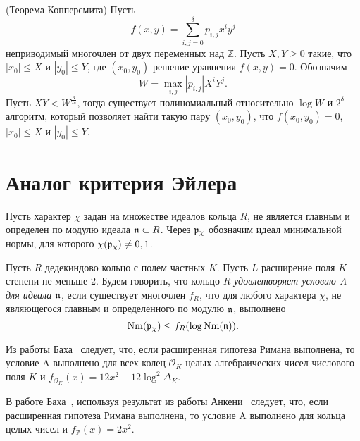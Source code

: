 \documentclass[_00_dissertation.tex]{subfiles}
\begin{document}
\begin{statement}\label{statement:coppersmith} \cite[с.~243]{source:Coppersmith} (Теорема Копперсмита)
    Пусть
    \begin{equation*}
        f(x, y) = \sum\limits_{i, j = 0}^{\delta} p_{i, j} x^i y^j
    \end{equation*}
    неприводимый многочлен от двух переменных над $\mathbb{Z}$.
    Пусть $X, Y \ge 0$ такие, что $|x_0| \le X$ и $|y_0| \le Y$, где $(x_0, y_0)$ решение уравнения $f(x, y) = 0$.
    Обозначим
    \begin{equation*}
        W = \max_{i, j} |p_{i, j}| X^i Y^j.
    \end{equation*}
    Пусть $XY < W^{\frac{3}{2\delta}}$, тогда существует полиномиальный относительно $\log W$ и $2^\delta$ алгоритм, который позволяет найти такую пару $(x_0, y_0)$, что $f(x_0, y_0) = 0$, $|x_0| \le X$ и $|y_0| \le Y$.
\end{statement}

\section{Аналог критерия Эйлера}

Пусть характер $\chi$ задан на множестве идеалов кольца $R$, не является главным и определен по модулю идеала $\mathfrak{n} \subset R$.
Через $\mathfrak{p}_{\chi}$ обозначим идеал минимальной нормы, для которого $\chi(\mathfrak{p}_{\chi}) \neq 0, 1$.

Пусть $R$ дедекиндово кольцо с полем частных $K$.
Пусть $L$ расширение поля $K$ степени не меньше $2$.
Будем говорить, что кольцо $R$ \emph{удовлетворяет условию A для идеала $\mathfrak{n}$}, если существует многочлен $f_R$, что для любого характера $\chi$, не являющегося главным и определенного по модулю $\mathfrak{n}$, выполнено
\begin{equation*}
    \textrm{Nm}(\mathfrak{p}_{\chi}) \le f_R(\log{\textrm{Nm}(\mathfrak{n})}).
\end{equation*}

\begin{remark}
    Из работы Баха~\cite[с.~375]{source:Bach} следует, что, если расширенная гипотеза Римана выполнена, то условие A выполнено для всех колец $\mathcal{O}_K$ целых алгебраических чисел числового поля $K$ и $f_{\mathcal{O}_K}(x) = 12x^2 + 12\log^2 \Delta_{K}$.
\end{remark}

\begin{remark}
    В работе Баха~\cite[с.~372]{source:Bach}, используя результат из работы Анкени~\cite{source:Ankeny} следует, что, если расширенная гипотеза Римана выполнена, то условие A выполнено для кольца целых чисел и $f_{\mathbb{Z}}(x) = 2x^2$.
\end{remark}
\end{document}
